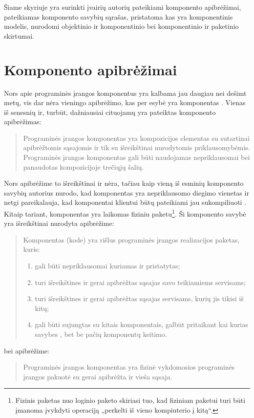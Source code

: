 
\label{chapter:component}

Šiame skyriuje yra surinkti įvairių autorių pateikiami komponento
apibrėžimai, pateikiamas komponento savybių sąrašas, pristatoma kas
yra komponentinis modelis, nurodomi objektinio ir komponentinio
bei komponentinio ir paketinio skirtumai.

\section{Komponento apibrėžimai}

\label{section:component:descriptions}

Nors apie programinės įrangos komponentus yra kalbama jau daugiau
nei dešimt metų, vis dar nėra vieningo apibrėžimo, kas per esybė
yra komponentas \cite{classification-framework-for-scm}. Vienas
iš senesnių ir, turbūt, dažniausiai cituojamų yra 
\cite[41]{cs-beyond-object-oriented-programming}
pateiktas komponento apibrėžimas:
\begin{quote}
  Programinės įrangos komponentas yra kompozicijos elementas su
  sutartinai apibrėžtomis sąsajomis ir tik su išreikštinai
  nurodytomis priklausomybėmis. Programinės įrangos komponentas
  gali būti naudojamas nepriklausomai bei panaudotas
  kompozicijoje trečiųjų šalių.
\end{quote}
Nors apibrėžime to išreikštinai ir nėra, tačiau kaip vieną iš
esminių komponento savybių autorius nurodo, kad komponentas yra
nepriklausomo diegimo vienetas 
\cite[36]{cs-beyond-object-oriented-programming} ir netgi
pareikalauja, kad komponentai klientui būtų pateikiami jau
sukompiliuoti \cite{point-counterpoint}. Kitaip tariant, komponentas
yra laikomas fiziniu paketu\footnote{Fizinis paketas nuo loginio paketo
skiriasi tuo, kad fiziniam paketui turi būti įmanoma įvykdyti
operaciją „perkelti iš vieno kompiuterio į kitą“.}. Ši
komponento savybė yra išreikštinai
nurodyta \cite[385]{objects-components-and-frameworks-with-uml}
apibrėžime:
\begin{quote}
  Komponentas (kode) yra rišlus programinės įrangos realizacijos
  paketas, kuris:
  \begin{enumerate}
    \item gali būti nepriklausomai kuriamas ir pristatytas;
    \item turi išreikštines ir gerai apibrėžtas sąsajas savo teikiamiems
      servisams;
    \item turi išreikštines ir gerai apibrėžtas sąsajas servisams,
      kurių jis tikisi iš kitų;
    \item gali būti sujungtas su kitais komponentais, galbūt pritaikant
      kai kurias savybes , bet be pačių komponentų
      keitimo.
  \end{enumerate}
\end{quote}
bei \cite[1]{Hopkins:2000:CP:352183.352198} apibrėžime:
\begin{quote}
  Programinės įrangos komponentas yra fizinė vykdomosios programinės
  įrangos pakuotė su gerai apibrėžta ir vieša sąsaja.
\end{quote}

